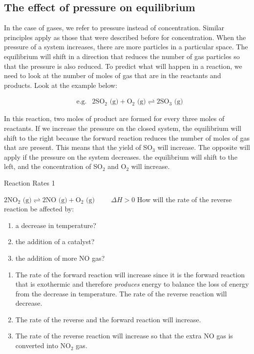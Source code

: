 \subsection{The effect of pressure on equilibrium}

In the case of gases, we refer to pressure instead of concentration. Similar principles apply as those that were described before for concentration. When the pressure of a system increases, there are more particles in a particular space. The equilibrium will shift in a direction that reduces the number of gas particles so that the pressure is also reduced. To predict what will happen in a reaction, we need to look at the number of moles of gas that are in the reactants and products. Look at the example below:

\begin{eqnarray*}
  & \text{e.g.} & 2\text{SO}_{2}\text{ (g)} + \text{O}_{2}\text{ (g)} \rightleftharpoons 2\text{SO}_{3}\text{ (g)}
\end{eqnarray*}

In this reaction, two moles of product are formed for every three moles of reactants. If we increase the pressure on the closed system, the equilibrium will shift to the right because the forward reaction reduces the number of moles of gas that are present. This means that the yield of SO$_{3}$ will increase. The opposite will apply if the pressure on the system decreases. the equilibrium will shift to the left, and the concentration of SO$_{2}$ and O$_{2}$ will increase. 


\begin{wex}{Reaction Rates 1}{
$2\text{NO}_{2}\text{ (g)}\rightleftharpoons 2\text{NO (g)} + \text{O}_{2}\text{ (g)} \hspace{1cm} \Delta H > 0$
How will the rate of the reverse reaction be affected by:
\begin{enumerate}
  \item a decrease in temperature?
  \item the addition of a catalyst?
  \item the addition of more NO gas?
\end{enumerate}}
  {
\begin{enumerate}
  \item         The rate of the forward reaction will increase since it is the forward reaction that is exothermic and therefore \textit{produces} energy to balance the loss of energy from the decrease in temperature. The rate of the reverse reaction will decrease. 
 
  \item The rate of the reverse and the forward reaction will increase.
  \item         The rate of the reverse reaction
  will increase so that the extra NO gas is converted into NO$_{2}$ gas. 
\end{enumerate}}  
\end{wex}

